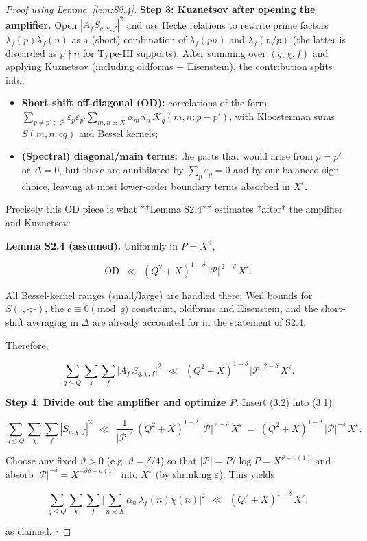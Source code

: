\documentclass[11pt]{article}
\theoremstyle{definition}
\theoremstyle{remark}
\begin{document}
\begin{proof}[Proof using Lemma~\ref{lem:S2.4}]
	\noindent\textbf{Step 3: Kuznetsov after opening the amplifier.}
	Open $|A_f S_{q,\chi,f}|^2$ and use Hecke relations to rewrite prime factors $\lambda_f(p)\lambda_f(n)$ as a (short) combination of $\lambda_f(pn)$ and $\lambda_f(n/p)$ (the latter is discarded as $p\nmid n$ for Type-III supports). After summing over $(q,\chi,f)$ and applying Kuznetsov (including oldforms + Eisenstein), the contribution splits into:

	\begin{itemize}
		\item \textbf{Short-shift off-diagonal (OD):} correlations of the form
		      $\sum_{p\neq p'\in\mathcal P}\varepsilon_p\varepsilon_{p'}\sum_{m,n\asymp X}\alpha_m\overline{\alpha_n}\, \mathcal{K}_{q}(m, n; p-p')$,
		      with Kloosterman sums $S(m,n;cq)$ and Bessel kernels;
		\item \textbf{(Spectral) diagonal/main terms:} the parts that would arise from $p=p'$ or $\Delta=0$, but these are annihilated by $\sum_p\varepsilon_p=0$ and by our balanced-sign choice, leaving at most lower-order boundary terms absorbed in $X^{\varepsilon}$.
	\end{itemize}

	Precisely this OD piece is what **Lemma S2.4** estimates *after* the amplifier and Kuznetsov:

	\noindent\textbf{Lemma S2.4 (assumed).} Uniformly in $P=X^\vartheta$,

	$$
		\mathrm{OD}\ \ \ll\ \ (Q^2+X)^{1-\delta}\,|\mathcal P|^{\,2-\delta}\,X^{\varepsilon}.
	$$

	All Bessel-kernel ranges (small/large) are handled there; Weil bounds for $S(\cdot,\cdot;\cdot)$, the $c\equiv0\pmod q$ constraint, oldforms and Eisenstein, and the short-shift averaging in $\Delta$ are already accounted for in the statement of S2.4.

	Therefore,

	\begin{equation}
		\sum_{q\le Q}\sum_{\chi}\sum_f \big|A_f\,S_{q,\chi,f}\big|^2
		\ \ \ll\ \ (Q^2+X)^{1-\delta}\,|\mathcal P|^{\,2-\delta}\,X^{\varepsilon}.
		\tag{3.2}
	\end{equation}


	\noindent\textbf{Step 4: Divide out the amplifier and optimize $P$.}
	Insert (3.2) into (3.1):

	$$
		\sum_{q\le Q}\sum_{\chi}\sum_f |S_{q,\chi,f}|^2
		\ \ \ll\ \ \frac{1}{|\mathcal P|^2}\ (Q^2+X)^{1-\delta}\,|\mathcal P|^{\,2-\delta}\,X^{\varepsilon}
		\ =\ (Q^2+X)^{1-\delta}\,|\mathcal P|^{-\delta}\,X^{\varepsilon}.
	$$

	Choose any fixed $\vartheta>0$ (e.g. $\vartheta=\delta/4$) so that $|\mathcal P|=P/\log P=X^{\vartheta+o(1)}$ and absorb $|\mathcal P|^{-\delta}=X^{-\vartheta\delta+o(1)}$ into $X^{\varepsilon}$ (by shrinking $\varepsilon$). This yields

	$$
		\sum_{q\le Q}\sum_{\chi}\sum_f \Big|\sum_{n\asymp X}\alpha_n\,\lambda_f(n)\chi(n)\Big|^2
		\ \ \ll\ \ (Q^2+X)^{1-\delta}\,X^{\varepsilon},
	$$

	as claimed. $\square$

\end{proof}
\end{document}
